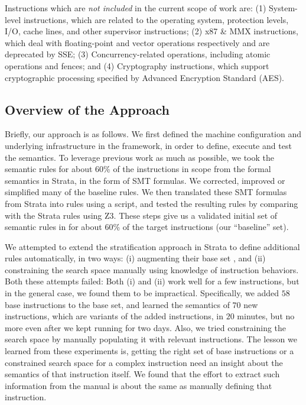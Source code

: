 Instructions which are \emph{not included} in the current scope of work are: 
(1) System-level instructions, which are related to the operating system, 
protection levels, I/O, cache lines, and other supervisor instructions; 
(2) x87 \& MMX instructions, which deal with floating-point and vector 
operations respectively and are deprecated by SSE; 
(3) Concurrency-related operations, including atomic operations and fences; and 
(4) Cryptography instructions, which support cryptographic processing specified by Advanced Encryption Standard (AES).

\subsection{Overview of the Approach}
\label{sec:Approach:Overview}

Briefly, our approach is as follows.
%
We first defined the machine configuration and underlying infrastructure in the \K framework, in order to define, execute and test the \ISA semantics.
%
To leverage previous work as much as possible, we took the semantic rules for about 60\% of the instructions in scope from the formal semantics in Strata, in the form of SMT formulas.
%
We corrected, improved or simplified many of the baseline rules.
%
We then translated these SMT formulas from Strata into \K rules using a script, and tested the resulting rules by comparing with the Strata rules using Z3.
%
These steps give us a validated initial set of semantic rules in \K for about 60\% of the target instructions (our ``baseline'' set).

We attempted to extend the stratification approach in Strata to define additional rules automatically, in two ways: (i) augmenting their base set , and (ii) constraining the search space manually using knowledge of instruction behaviors.  Both these attempts failed: Both (i) and (ii) work well for a few instructions, but in the general case, we found them to be impractical. Specifically, we added $58$ base instructions to the base set, and learned the semantics of $70$ new instructions, which are variants of the added  instructions, in $20$ minutes, but no more even after we kept running for two days. Also, we tried constraining the search space by manually populating it with relevant instructions. The lesson we learned from these experiments is, getting the right set of base instructions or a constrained search space for a complex instruction need an insight about the semantics of that instruction itself. We found that the effort to extract such information from the manual is about the same  as manually defining that instruction.
 

